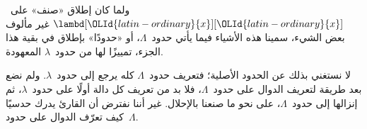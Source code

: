 \documentclass[../../../include/open-logic-section]{subfiles}
\begin{document}
ولما كان إطلاق «صنف» على~$\lambd[{\OLId{latin-ordinary}{x}}][{\OLId{latin-ordinary}{x}}]$ غير مألوف بعض الشيء،
سمينا هذه الأشياء فيما يأتي حدود~$\Lambda$، أو «حدودًا» بإطلاق في بقية هذا الجزء،
تمييزًا لها من حدود~$\lambda$ المعهودة.

\begin{editorial}
  لا نستغني بذلك عن الحدود الأصلية؛ فتعريف حدود~$\Lambda$ كله يرجع إلى
  حدود~$\lambda$. ولم نضع بعد طريقة لتعريف الدوال على حدود~$\Lambda$،
  فلا بد من تعريف كل دالة أولًا على حدود~$\lambda$،
  ثم إنزالها إلى حدود~$\Lambda$، على نحو ما صنعنا بالإحلال.
  غير أننا نفترض أن القارئ يدرك حدسيًا كيف تعرّف الدوال على حدود~$\Lambda$.
\end{editorial}
\end{document}

